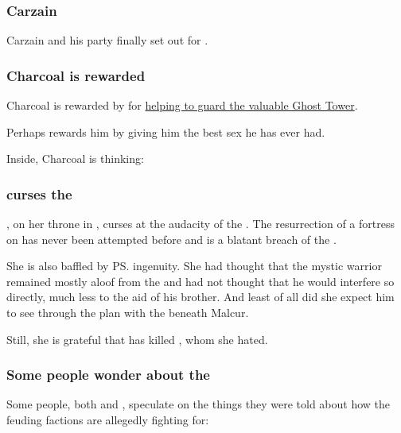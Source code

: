 \begin{garbage}
\subsubsection{Carzain}
Carzain and his party finally set out for \Redce. 





\subsubsection{Charcoal is rewarded}
Charcoal is rewarded by \Achsah{} for \hyperref[Charcoal at the Ghost Tower]{helping to guard the valuable Ghost Tower}.

Perhaps \Achsah{} rewards him by giving him the best sex he has ever had.

Inside, Charcoal is thinking: 





\subsubsection{\Achsah{} curses the \dragons}
\Achsah, on her throne in \Nyx, curses at the audacity of the \dragons. The resurrection of a \Machaic{} fortress on \Miith{} has never been attempted before and is a blatant breach of the \charade. 

She is also baffled by \ps{\Ishnaruchaefir} ingenuity. She had thought that the mystic warrior remained mostly aloof from the \secretwar{} and had not thought that he would interfere so directly, much less to the aid of his brother. And least of all did she expect him to see through the plan with the \ghobaleth{} beneath Malcur. 


Still, she is grateful that \Ishnaruchaefir{} has killed \Teshrial, whom she hated. 





\subsubsection{Some people wonder about the }
Some people, both \human{} and \scathaese{}, speculate on the things they were told about how the feuding factions are allegedly fighting for: 






\end{garbage}
